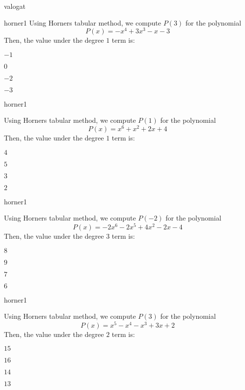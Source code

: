 \documentclass[12pt]{article}
\begin{document}
\begin{quiz}{valogat}
\begin{multi}{horner1}
Using Horners tabular method, we compute $P(3)$ for the polynomial
$$P(x)=-x^4+3x^3-x-3$$
Then, the value under the degree $1$ term is:
\item* $ -1 $
\item  $ 0 $
\item  $ -2 $
\item  $ -3 $
\end{multi}
\begin{multi}{horner1}

Using Horners tabular method, we compute $P(1)$ for the polynomial
$$P(x)=x^6+x^2+2x+4$$
Then, the value under the degree $1$ term is:
\item* $ 4 $
\item  $ 5 $
\item  $ 3 $
\item  $ 2 $
\end{multi}
\begin{multi}{horner1}

Using Horners tabular method, we compute $P(-2)$ for the polynomial
$$P(x)=-2x^6-2x^5+4x^2-2x-4$$
Then, the value under the degree $3$ term is:
\item* $ 8 $
\item  $ 9 $
\item  $ 7 $
\item  $ 6 $
\end{multi}
\begin{multi}{horner1}

Using Horners tabular method, we compute $P(3)$ for the polynomial
$$P(x)=x^5-x^4-x^3+3x+2$$
Then, the value under the degree $2$ term is:
\item* $ 15 $
\item  $ 16 $
\item  $ 14 $
\item  $ 13 $
\end{multi}
\end{quiz}
\end{document}
